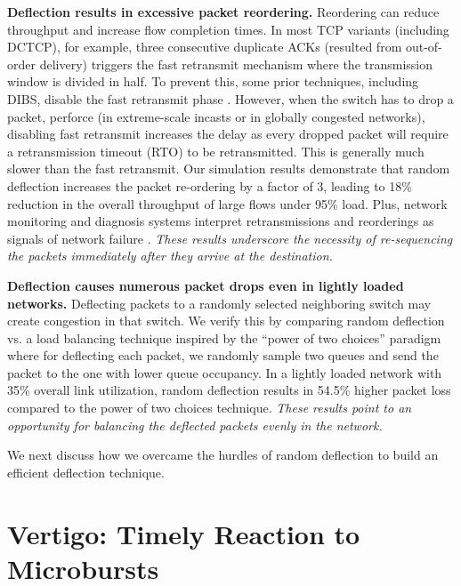 \textbf{Deflection results in excessive packet reordering.} 
Reordering can reduce throughput and increase flow completion times. 
In most TCP variants (including DCTCP), for example, three consecutive duplicate ACKs (resulted from out-of-order delivery) triggers the fast retransmit mechanism where the transmission window is divided in half. To prevent this, some prior techniques, including DIBS, disable the fast retransmit phase \cite{dibs, pabo}. However, when the switch has to drop a packet, perforce (\eg in extreme-scale incasts or in globally congested networks), disabling fast retransmit increases the delay as every dropped packet will require a retransmission timeout (RTO) to be retransmitted. This is generally much slower than the fast retransmit. Our simulation results demonstrate that random deflection increases the packet re-ordering by a factor of 3, leading to 18\% reduction in the overall throughput of large flows under 95\% load.
Plus, network monitoring and diagnosis systems interpret retransmissions and reorderings as signals of network failure \cite{007,blame,netseer}.
\emph{These results underscore the necessity of re-sequencing the packets immediately after they arrive at the destination.} 

\textbf{Deflection causes numerous packet drops even in lightly loaded networks.} 
Deflecting packets to a randomly selected neighboring switch may create congestion in that switch. We verify this by comparing random deflection vs. a load balancing technique inspired by the ``power of two choices'' paradigm \cite{poweroftwosurvey} where for deflecting each packet, we randomly sample two queues and send the packet to the one with lower queue occupancy. In a lightly loaded network with 35\% overall link utilization, random deflection results in 54.5\% higher packet loss compared to the power of two choices technique.
\emph{These results point to an opportunity for 
balancing the deflected packets evenly in the network.}


We next discuss how we overcame the hurdles of random deflection to build an efficient deflection technique.%

\section{Vertigo: Timely Reaction to Microbursts}

